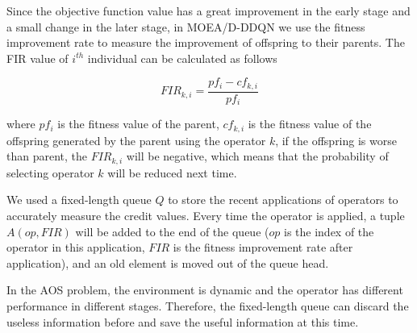 \documentclass[journal]{IEEEtran}
\begin{document}
Since the objective function value has a great improvement in the early stage and a small change in the later stage, in MOEA/D-DDQN we use the fitness improvement rate to measure the improvement of offspring to their parents.
The FIR value of $i^{th}$ individual can be calculated as follows




\begin{equation}
  FIR_{k,i}=\frac{pf_{i}-cf_{k,i}}{pf_{i}}
\end{equation}

where $pf_{i}$ is the fitness value of the parent, $cf_{k,i}$ is the fitness value of the offspring generated by the parent using the operator $k$, if the offspring is worse than parent, the $FIR_{k,i}$ will be negative, which means that the probability of selecting operator $k$ will be reduced next time.

We used a fixed-length queue $Q$ to store the recent applications of operators to accurately measure the credit values.
Every time the operator is applied, a tuple $A (op, FIR)$ will be added to the end of the queue ($op$ is the index of the operator in this application, $FIR$ is the fitness improvement rate after application), and an old element is moved out of the queue head.

In the AOS problem, the environment is dynamic and the operator has different performance in different stages. Therefore, the fixed-length queue can discard the useless information before and save the useful information at this time.
\end{document}
